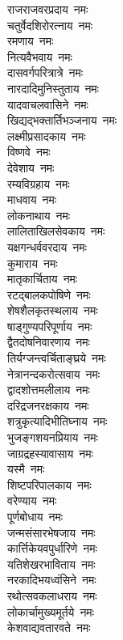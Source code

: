 \begin{multicols}{2}
\begin{flushleft}
राजराजवरप्रदाय~नमः\\
चतुर्वेदशिरोरत्नाय~नमः\\
रमणाय~नमः\\
नित्यवैभवाय~नमः\\
दासवर्गपरित्रात्रे~नमः\\
नारदादिमुनिस्तुताय~नमः\\
यादवाचलवासिने~नमः\\
खिद्यद्भक्तार्तिभञ्जनाय~नमः\\
लक्ष्मीप्रसादकाय~नमः\\
विष्णवे~नमः\hfill{}\\
                                                        
देवेशाय~नमः\\
रम्यविग्रहाय~नमः\\
माधवाय~नमः\\
लोकनाथाय~नमः\\
लालिताखिलसेवकाय~नमः\\
यक्षगन्धर्ववरदाय~नमः\\
कुमाराय~नमः\\
मातृकार्चिताय~नमः\\
रटद्बालकपोषिणे~नमः\\
शेषशैलकृतस्थलाय~नमः\hfill{}\\
                                                        
षाड्गुण्यपरिपूर्णाय~नमः\\
द्वैतदोषनिवारणाय~नमः\\
तिर्यग्जन्त्वर्चिताङ्घ्रये~नमः\\
नेत्रानन्दकरोत्सवाय~नमः\\
द्वादशोत्तमलीलाय~नमः\\
दरिद्रजनरक्षकाय~नमः\\
शत्रुकृत्यादिभीतिघ्नाय~नमः\\
भुजङ्गशयनप्रियाय~नमः\\
जाग्रद्रहस्यावासाय~नमः\\
यस्मै~नमः\hfill{}\\
        
शिष्टपरिपालकाय~नमः\\
वरेण्याय~नमः\\
पूर्णबोधाय~नमः\\
जन्मसंसारभेषजाय~नमः\\
कार्त्तिकेयवपुर्धारिणे~नमः\\
यतिशेखरभाविताय~नमः\\
नरकादिभयध्वंसिने~नमः\\
रथोत्सवकलाधराय~नमः\\
लोकार्चामुख्यमूर्तये~नमः\\
केशवाद्यवतारवते~नमः\hfill{}\\
                                                        

\end{flushleft}
\end{multicols}
